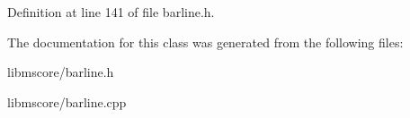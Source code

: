 Definition at line 141 of file barline.\+h.



The documentation for this class was generated from the following files\+:\begin{DoxyCompactItemize}
\item 
libmscore/barline.\+h\item 
libmscore/barline.\+cpp\end{DoxyCompactItemize}
